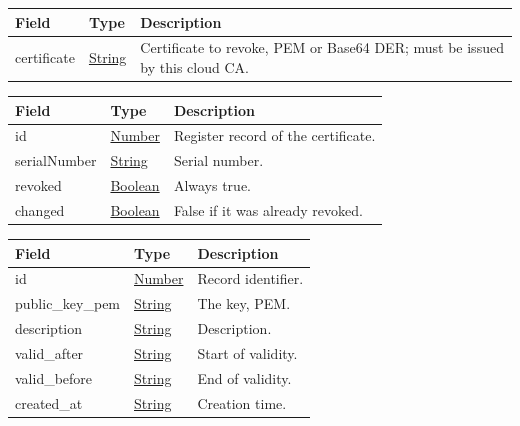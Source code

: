 \documentclass[a4paper]{arrowhead}
\newcommand{\pref}[1]{{\textcolor{ArrowheadGrey}{\hyperref[sec:model:primitives:#1]{#1}}}}
\begin{document}




\noindent\begin{tabularx}{\textwidth}{| >{\raggedright\arraybackslash}p{3.9cm} | >{\raggedright\arraybackslash\small}p{5.3cm} | X |} \hline
\rowcolor{gray!33} Field & Type & Description \\ \hline
certificate & \pref{String} & Certificate to revoke, PEM or Base64 DER; must be issued by this cloud CA. \\ \hline
\end{tabularx}







\noindent\begin{tabularx}{\textwidth}{| >{\raggedright\arraybackslash}p{3.9cm} | >{\raggedright\arraybackslash\small}p{5.3cm} | X |} \hline
\rowcolor{gray!33} Field & Type & Description \\ \hline
id & \pref{Number} & Register record of the certificate. \\ \hline
serial\allowbreak{}Number & \pref{String} & Serial number. \\ \hline
revoked & \pref{Boolean} & Always true. \\ \hline
changed & \pref{Boolean} & False if it was already revoked. \\ \hline
\end{tabularx}







\noindent\begin{tabularx}{\textwidth}{| >{\raggedright\arraybackslash}p{3.9cm} | >{\raggedright\arraybackslash\small}p{5.3cm} | X |} \hline
\rowcolor{gray!33} Field & Type & Description \\ \hline
id & \pref{Number} & Record identifier. \\ \hline
public\_key\_pem & \pref{String} & The key, PEM. \\ \hline
description & \pref{String} & Description. \\ \hline
valid\_after & \pref{String} & Start of validity. \\ \hline
valid\_before & \pref{String} & End of validity. \\ \hline
created\_at & \pref{String} & Creation time. \\ \hline
\end{tabularx}
\end{document}
